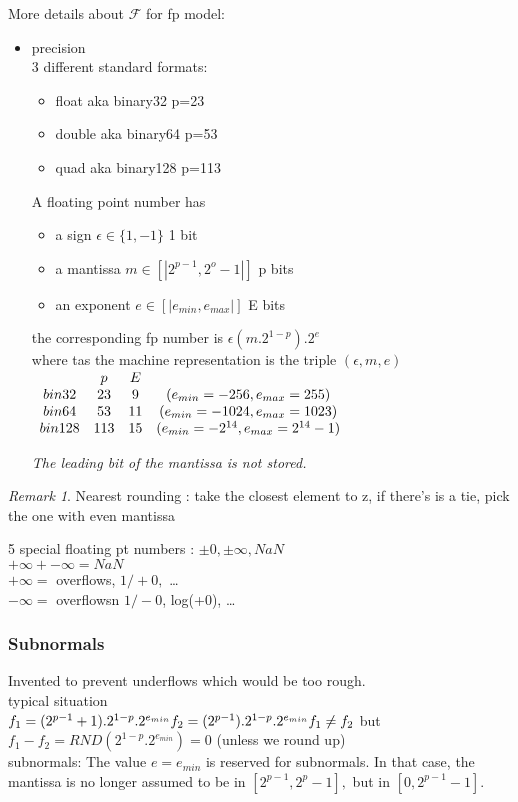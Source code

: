 \documentclass{article}
\theoremstyle{definition}
\theoremstyle{remark}
\newtheorem*{remark}{Remark}
\begin{document}
	More details about $ \mathcal{F} $ for fp model:
	\begin{itemize}[label=$*$]
		\item precision\\
		3 different standard formats:
		\begin{itemize}[label=]
			\item float aka binary32	p=23
			\item double aka binary64	p=53
			\item quad aka binary128	p=113
		\end{itemize}
		A floating point number has
		\begin{itemize}[label=$-$]
			\item a sign $\epsilon\in\{1,-1\}$	1 bit
			\item a mantissa $m \in[|2^{p-1}, 2^o-1|]$	p bits
			\item an exponent $e \in [|e_{min},e_{max}|]$ 	E bits
		\end{itemize}
		the corresponding fp number is $\epsilon(m.2^{1-p}).2^e$\\
		where tas the machine representation is the triple $(\epsilon,m,e)$\\
		
		$ \begin{array}{c c c c}
		& p & E &\\
		bin32 & 23 & 9 & (e_{min} = -256,e_{max} = 255)\\
		bin64 & 53 & 11 & (e_{min} = -1024,e_{max} = 1023)\\
		bin128 & 113 & 15 & (e_{min} = -2^{14},e_{max} = 2^{14}-1)
		\end{array} $
		
		\emph{The leading bit of the mantissa is not stored.}
	\end{itemize}
	\begin{remark}
		Nearest rounding : take the closest element to z, if there's is a tie, pick the one with even mantissa
	\end{remark}
	5 special floating pt numbers : $\pm 0, \pm \infty, NaN$\\
	$+\infty + -\infty = NaN$\\
	$+\infty =$ overflows, $1/+0,$ \dots\\
	$-\infty =$ overflowsn $1/-0$, log(+0), \dots
	\subsubsection{Subnormals} Invented to prevent underflows which would be too rough.\\
	typical situation\\
	$f_1 = (2^{p-1}+1).2^{1-p}.2^{e_{min}}\\
	f_2 = (2^{p-1}).2^{1-p}.2^{e_{min}}\\
	f_1 \neq f_2$ but $f_1 - f_2 = RND(2^{1-p}.2^{e_{min}}) = 0$ (unless we round up)\\
	subnormals: The value $e = e_{min}$ is reserved for subnormals. In that case, the mantissa is no longer assumed to be in $[2^{p-1},2^p-1],$ but in $[0,2^{p-1}-1]$.
	
\end{document}
